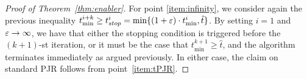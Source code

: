 \begin{proof}[Proof of Theorem~\ref{thm:enabler}]
For point \ref{item:infinity}, we consider again the previous inequality $t^{i+k}_{\min}\geq t^i_{stop}=\min\{(1+\varepsilon)\cdot t^i_{\min}, \hat{t}\}$. By setting $i=1$ and $\varepsilon\rightarrow \infty$, we have that either the stopping condition is triggered before the $(k+1)$-st iteration, or it must be the case that $t^{k+1}_{\min}\geq \hat{t}$, and the algorithm terminates immediately as argued previously. In either case, the claim on standard PJR follows from point~\ref{item:tPJR}.
\end{proof}